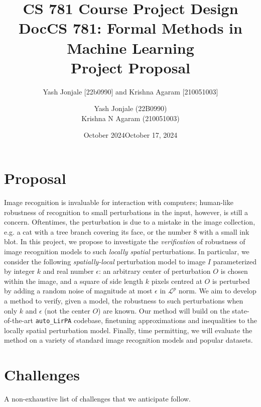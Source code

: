 \documentclass{article}
\title{CS 781 Course Project Design Doc}
\author{Yash Jonjale [22b0990] and Krishna Agaram [210051003]}
\date{October 2024}
\title{CS 781: Formal Methods in Machine Learning\\Project Proposal}
\author{Yash Jonjale (22B0990)\\Krishna N Agaram (210051003)}
\date{October 17, 2024}
\begin{document}
\maketitle
\tableofcontents

\newpage

\section{Proposal}\label{sec:proposal}

Image recognition is invaluable for interaction with computers; human-like robustness of recognition to small perturbations in the input, however, is still a concern. Oftentimes, the perturbation is due to a mistake in the image collection, e.g. a cat with a tree branch covering its face, or the number 8 with a small ink blot. In this project, we propose to investigate the \emph{verification} of robustness of image recognition models to such \emph{locally spatial} perturbations. In particular, we consider the following \emph{spatially-local} perturbation model to image $I$ parameterized by integer $k$ and real number $\epsilon$: an arbitrary center of perturbation $O$ is chosen within the image, and a square of side length $k$ pixels centred at $O$ is perturbed by adding a random noise of magnitude at most $\epsilon$ in $\mathcal L^p$ norm. We aim to develop a method to verify, given a model, the robustness to such perturbations when only $k$ and $\epsilon$ (not the center $O$) are known. Our method will build on the state-of-the-art \texttt{auto\_LirPA} codebase, finetuning approximations and inequalities to the locally spatial perturbation model. Finally, time permitting, we will evaluate the method on a variety of standard image recognition models and popular datasets.

\section{Challenges}\label{sec:challenges}

A non-exhaustive list of challenges that we anticipate follow.
\end{document}
